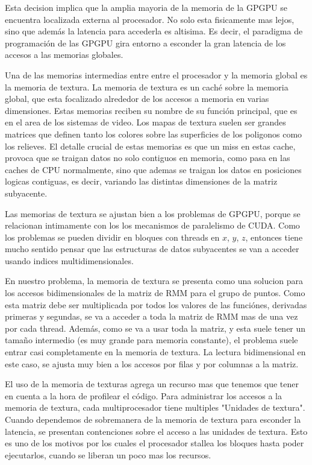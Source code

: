 Esta decision implica que la amplia mayoria de la memoria de la GPGPU se encuentra
localizada externa al procesador.  No solo esta fisicamente mas lejos, sino que
adem\'as la latencia para accederla es altisima. Es decir, el paradigma de
programaci\'on de las GPGPU gira entorno a esconder la gran latencia de los accesos
a las memorias globales.

Una de las memorias intermedias entre entre el procesador y la memoria global es
la memoria de textura. La memoria de textura es un cach\'e sobre la memoria global,
que esta focalizado alrededor de los accesos a memoria en varias dimensiones.
Estas memorias reciben su nombre de su funci\'on principal, que es en el area de los
sistemas de video. Los mapas de textura suelen ser grandes matrices que definen
tanto los colores sobre las superficies de los poligonos como los relieves.
El detalle crucial de estas memorias es que un miss en estas cache, provoca
que se traigan datos no solo contiguos en memoria, como pasa en las caches de
CPU normalmente, sino que ademas se traigan los datos en posiciones logicas contiguas,
es decir, variando las distintas dimensiones de la matriz subyacente.

Las memorias de textura se ajustan bien a los problemas de GPGPU, porque se relacionan
intimamente con los los mecanismos de paralelismo de CUDA. Como los problemas se pueden
dividir en bloques con threads en $x$, $y$, $z$, entonces tiene mucho sentido pensar
que las estructuras de datos subyacentes se van a acceder usando indices multidimensionales.

En nuestro problema, la memoria de textura se presenta como una solucion para
los accesos bidimensionales de la matriz de RMM para el grupo de puntos.
Como esta matriz debe ser multiplicada por todos los valores de las funci\'ones,
derivadas primeras y segundas, se va a acceder a toda la matriz de RMM mas de
una vez por cada thread. Adem\'as, como se va a usar toda la matriz, y esta suele
tener un tamaño intermedio (es muy grande para memoria constante), el problema
suele entrar casi completamente en la memoria de textura.
La lectura bidimensional en este caso, se ajusta muy bien a los accesos por filas
y por columnas a la matriz.

El uso de la memoria de texturas agrega un recurso mas que tenemos que tener en
cuenta a la hora de profilear el c\'odigo. Para administrar los accesos a
la memoria de textura, cada multiprocesador tiene multiples "Unidades de textura".
Cuando dependemos de sobremanera de la memoria de textura para esconder la latencia,
se presentan contenciones sobre el acceso a las unidades de textura. Esto es
uno de los motivos por los cuales el procesador stallea los bloques hasta poder
ejecutarlos, cuando se liberan un poco mas los recursos.


